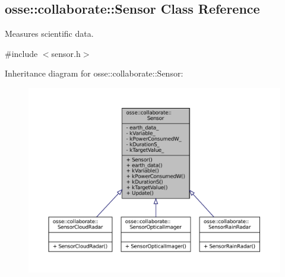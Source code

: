 \hypertarget{classosse_1_1collaborate_1_1_sensor}{}\subsection{osse\+:\+:collaborate\+:\+:Sensor Class Reference}
\label{classosse_1_1collaborate_1_1_sensor}


Measures scientific data.  




{\ttfamily \#include $<$sensor.\+h$>$}



Inheritance diagram for osse\+:\+:collaborate\+:\+:Sensor\+:
\nopagebreak
\begin{figure}[H]
\begin{center}
\leavevmode
\includegraphics[width=350pt]{classosse_1_1collaborate_1_1_sensor__inherit__graph}
\end{center}
\end{figure}
